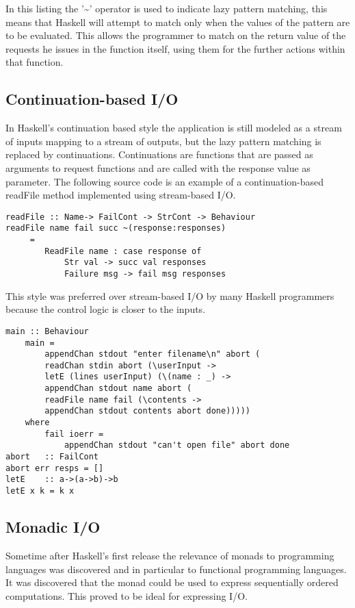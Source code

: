 In this listing the '\textasciitilde' operator is used to indicate lazy pattern matching, this means that Haskell will attempt to match only when the values of the pattern are to be evaluated. This allows the programmer to match on the return value of the requests he issues in the function itself, using them for the further actions within that function.

\subsection{Continuation-based I/O}
In Haskell's continuation based style the application is still modeled as a stream of inputs mapping to a stream of outputs, but the lazy pattern matching is replaced by continuations. Continuations are functions that are passed as arguments to request functions and are called with the response value as parameter. The following source code is an example of a continuation-based readFile method implemented using stream-based I/O.

\begin{lstlisting}[caption={Definition of readFile in continuation-based I/O in Haskell}]
readFile :: Name-> FailCont -> StrCont -> Behaviour
readFile name fail succ ~(response:responses)
	 =
		ReadFile name : case response of
			Str val -> succ val responses
			Failure msg -> fail msg responses
\end{lstlisting}

This style was preferred over stream-based I/O by many Haskell programmers because the control logic is closer to the inputs.

\begin{lstlisting}[caption={Example of continuation-based I/O in Haskell}]
main :: Behaviour
	main =
 		appendChan stdout "enter filename\n" abort (
		readChan stdin abort (\userInput ->
		letE (lines userInput) (\(name : _) ->
		appendChan stdout name abort (
		readFile name fail (\contents ->
		appendChan stdout contents abort done)))))
	where
		fail ioerr =
			appendChan stdout "can't open file" abort done
abort	:: FailCont
abort err resps = []
letE	:: a->(a->b)->b
letE x k = k x
\end{lstlisting}

\subsection{Monadic I/O}
Sometime after Haskell's first release the relevance of monads to programming languages was discovered and in particular to functional programming languages. It was discovered that the monad could be used to express sequentially ordered computations. This proved to be ideal for expressing I/O.

